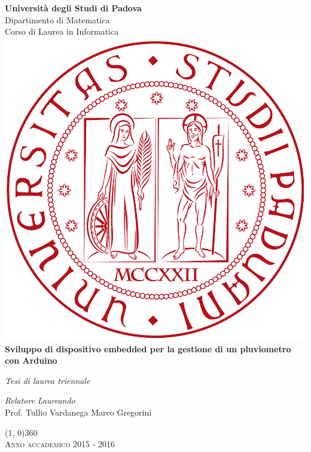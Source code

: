 \documentclass[11pt]{book}              %
\begin{document}
\frontmatter

\begin{titlepage}
\centering  
\textbf{\huge{Università degli Studi di Padova}} \\
\vspace{0.3cm}
\huge{Dipartimento di Matematica} \\
\vspace{0.3cm}
\LARGE{Corso di Laurea in Informatica} \\

\vspace{1cm}
\includegraphics[scale=0.2]{img/Logo_Unipd.png}  \\
\vspace{1cm}
\hspace{0.5cm}\textbf{\LARGE{ Sviluppo di dispositivo embedded per la gestione di un pluviometro con Arduino}}\\
\vspace{1.5cm}

\textit{Tesi di laurea triennale}\\
\vspace{0.5cm}

\begin{flushleft}
\textit{Relatore} \hfill \textit{Laureando}\\
Prof. Tullio Vardanega \hfill Marco Gregorini

\end{flushleft}
\line(1, 0){360}\\
\textsc{\small{Anno accademico 2015 - 2016}}
\end{titlepage}
\end{document}
